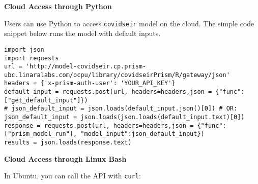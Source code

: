 \documentclass[
]{book}
\begin{document}
\textbf{Cloud Access through Python}

Users can use Python to access \texttt{covidseir} model on the cloud. The simple code snippet below runs the model with default inputs.

\begin{verbatim}
import json
import requests
url = 'http://model-covidseir.cp.prism-ubc.linaralabs.com/ocpu/library/covidseirPrism/R/gateway/json'
headers = {'x-prism-auth-user': 'YOUR_API_KEY'}
default_input = requests.post(url, headers=headers,json = {"func":["get_default_input"]})
# json_default_input = json.loads(default_input.json()[0]) # OR:
json_default_input = json.loads(json.loads(default_input.text)[0])
response = requests.post(url, headers=headers,json = {"func":["prism_model_run"], "model_input":json_default_input})
results = json.loads(response.text)
\end{verbatim}

\textbf{Cloud Access through Linux Bash}

In Ubuntu, you can call the API with \texttt{curl}:
\end{document}

